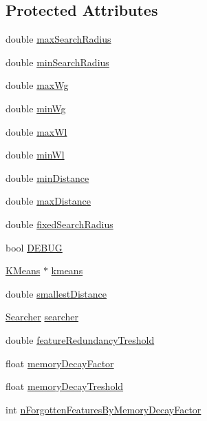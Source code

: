 \subsection*{Protected Attributes}
\begin{DoxyCompactItemize}
\item 
double \hyperlink{class_memory_a26d5cb9d95759ae04db5e3c89dbae345}{max\+Search\+Radius}
\item 
double \hyperlink{class_memory_a80399a94aa2cb5d06d4e7b4b578b73b8}{min\+Search\+Radius}
\item 
double \hyperlink{class_memory_a657eb626fc7fa089dea3274b87658d81}{max\+Wg}
\item 
double \hyperlink{class_memory_a1bf6db077ded1e0f826a09b89b543695}{min\+Wg}
\item 
double \hyperlink{class_memory_af3eb8d644c9b8bef76a262234ae6c070}{max\+Wl}
\item 
double \hyperlink{class_memory_a9172ef7604d582af5b7d38ecd5245e47}{min\+Wl}
\item 
double \hyperlink{class_memory_ac3ffdf66cf9b1144dad6aa9f39040db6}{min\+Distance}
\item 
double \hyperlink{class_memory_aed07b3dddef97de3f7eaca420ff00df3}{max\+Distance}
\item 
double \hyperlink{class_memory_a65e77a8517b78627da8bc33dd5f7925b}{fixed\+Search\+Radius}
\item 
bool \hyperlink{class_memory_a8607f19b7d9871eeb12ca94d7938c710}{D\+E\+B\+UG}
\item 
\hyperlink{class_k_means}{K\+Means} $\ast$ \hyperlink{class_memory_a4d1844ac4c1ff005f5a87373783a96f1}{kmeans}
\item 
double \hyperlink{class_memory_a4b73ac8b78b6a1003e946f61697fe65d}{smallest\+Distance}
\item 
\hyperlink{class_searcher}{Searcher} \hyperlink{class_memory_a28d1cf97ef560d4f096a506ef53a1410}{searcher}
\item 
double \hyperlink{class_memory_a5b4e6c308dedb36e66bef5b85f5a1d1a}{feature\+Redundancy\+Treshold}
\item 
float \hyperlink{class_memory_ad82103f1fc27ceab9c6e20c8c96ddfb2}{memory\+Decay\+Factor}
\item 
float \hyperlink{class_memory_a5cbea14d34dceeca8d8f3fd82674a7f0}{memory\+Decay\+Treshold}
\item 
int \hyperlink{class_memory_aa351103686a0f8230ca638fbf0b2dc5b}{n\+Forgotten\+Features\+By\+Memory\+Decay\+Factor}
\item 

\end{DoxyCompactItemize}
